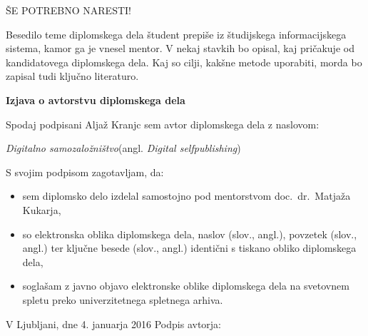 \documentclass[a4paper, 12pt]{book}
\newcommand{\clearemptydoublepage}{\newpage{\pagestyle{empty}\cleardoublepage}}
\begin{document}
ŠE POTREBNO NARESTI! 

Besedilo teme diplomskega dela študent prepiše iz študijskega informacijskega sistema, kamor ga je vnesel mentor. V nekaj stavkih bo opisal, kaj pričakuje od kandidatovega diplomskega dela. Kaj so cilji, kakšne metode uporabiti, morda bo zapisal tudi ključno literaturo.
\vspace{15mm}






\vspace{2cm}

\clearemptydoublepage

\vspace*{1cm}
\begin{center}
	{\Large \textbf{\sc Izjava o avtorstvu diplomskega dela}}
\end{center}

\vspace{1cm}
\noindent Spodaj podpisani Aljaž Kranjc sem avtor diplomskega dela z naslovom:

\vspace{0.5cm}
\emph{Digitalno samozaložništvo}\hspace{5mm}(angl. \emph{Digital selfpublishing})

\vspace{1.5cm}
\noindent S svojim podpisom zagotavljam, da:
\begin{itemize}
	\item sem diplomsko delo izdelal samostojno pod mentorstvom
	doc.\ dr.\ Matjaža Kukarja,
	
	\item	so elektronska oblika diplomskega dela, naslov (slov., angl.), povzetek (slov., angl.) ter ključne besede (slov., angl.) identični s tiskano obliko diplomskega dela,
	\item soglašam z javno objavo elektronske oblike diplomskega dela na svetovnem spletu preko univerzitetnega spletnega arhiva.	
\end{itemize}

\vspace{1cm}
\noindent V Ljubljani, dne 4. januarja 2016 \hfill Podpis avtorja:

\clearemptydoublepage


\pagestyle{empty}
\def\thepage{}%
\tableofcontents{}
\end{document}
